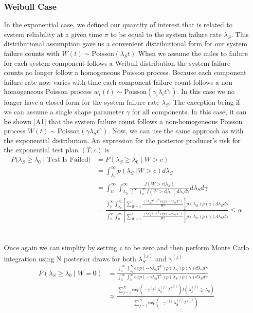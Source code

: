 \documentclass[12pt]{article}
\begin{document}
\subsubsection{Weibull Case}
In the exponential case, we defined our quantity of interest that is related to
system reliability at a given time $\pi$ to be equal to the system failure rate
$\lambda_S$.  This distributional assumption gave us a convenient distributional
form for our system failure counts with $W(t) \sim \text{Poisson}(\lambda_S t)$
When we assume the miles to failure for each system component follows a Weibull
distribution the system failure counts no longer follow a homogeneous Poisson
process.  Because each component failure rate now varies with time each
component failure count follows a non-homogeneous Poisson process $w_i(t) \sim
\text{Poisson}(\gamma_i \lambda_i t^{\gamma_i})$.  In this case we no longer
have a closed form for the system failure rate $\lambda_S$.  The exception being
if we can assume a single shape parameter $\gamma$ for all components.  In this
case, it can be shown [A1] that the system failure count follows a non-homogeneous
Poisson process $W(t) \sim \text{Poisson}(\gamma \lambda_S t^{\gamma})$.  Now,
we can use the same approach as with the exponential distribution. An expression
for the posterior producer's risk for the exponential test plan $(T,c)$ is
$$
\begin{aligned}
    P(\lambda_S \geq \lambda_0 \; \vert \; \text{Test Is Failed)} &= P(\lambda_S
    \geq \lambda_0 \; \vert \; W > c) \\ &= \int_{\lambda_0}^{\infty}
    p(\lambda_S \; \vert W > c) d\lambda_S \\ &= \int_{0}^{\infty}
    \int_{\lambda_0}^{\infty} \frac{f(W > c \vert \lambda_S)}{\int_{0}^{\infty}
    \int_{0}^{\infty} f(W > c \vert \lambda_S) d\lambda_S d\gamma} d\lambda_S
    d\gamma \\ &= \frac{\int_{0}^{\infty} \int_{\lambda_0}^{\infty}
    [\sum_{W=0}^c \frac{(\gamma \lambda_S T^{\gamma})^W exp(-\gamma \lambda_S
    T^{\gamma})}{W!}]p(\lambda_S)p(\gamma)d\lambda_S d\gamma} {\int_{0}^{\infty}
    \int_{0}^{\infty} [ \sum_{W=0}^c \frac{(\gamma \lambda_S T^{\gamma})^W
    exp(-\gamma \lambda_S T^{\gamma})} {W!}]p(\lambda_S) p(\gamma)
    d\lambda_Sd\gamma} \leq \alpha
\end{aligned}
$$
\\
\\
Once again we can simplify by setting c to be zero and then perform Monte Carlo
integration using N posterior draws for both $\lambda_S^{(j)}$ and
$\gamma^{(j)}$
$$
\begin{aligned}
	 P(\lambda_S \geq \lambda_0 \; \vert \; W = 0) &= \frac{\int_{0}^{\infty}
	 \int_{\lambda_0}^{\infty} exp(- \gamma \lambda_S T^{\gamma})p(\lambda_S)
	 p(\gamma) d\lambda_S d\gamma} {\int_{0}^{\infty} \int_{0}^{\infty} exp(-
	 \gamma \lambda_S T^{\gamma})p(\lambda_S) p(\gamma) d\lambda_S d\gamma} \\
	 &\approx \frac{\sum_{j = 1}^{N} exp(-\gamma^{(j)} \lambda_S^{(j)}
	 T^{\gamma^{(j)}}) I(\lambda_S^{(j)} \geq \lambda_0)} {\sum_{j = 1}^{N}
	 exp(- \gamma^{(j)} \lambda_S^{(j)} T^{\gamma^{(j)}})} \end{aligned}
$$
\end{document}
